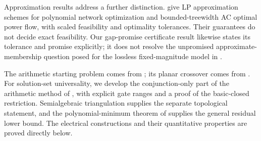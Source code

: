 Approximation results address a further distinction.
\citet[Theorem 7 and Corollary 8 of the arXiv version]{BienstockMunoz2018}
give LP approximation
schemes for polynomial network optimization and bounded-treewidth AC optimal
power flow, with scaled feasibility and optimality tolerances. Their
guarantees do not decide exact feasibility. Our gap-promise certificate
result likewise states its tolerance and promise explicitly; it does not
resolve the unpromised approximate-membership question posed for the
lossless fixed-magnitude model in
\citet[Section 1.3]{BienstockVermaPreprint2019}.

The arithmetic starting problem comes from
\citet{AbrahamsenEtAl2018,AbrahamsenEtAl2022}; its planar crossover comes from
\citet{DobbinsEtAl2023}. For solution-set universality, we develop the
conjunction-only part of the arithmetic method of
\citet{AbrahamsenMiltzow2019}, with explicit gate ranges and a proof of the
basic-closed restriction. Semialgebraic triangulation
\citep{OhmotoShiota2017} supplies the separate topological statement, and
the polynomial-minimum theorem of \citet{JeronimoEtAl2013} supplies the
general residual lower bound. The electrical constructions and their
quantitative properties are proved directly below.
